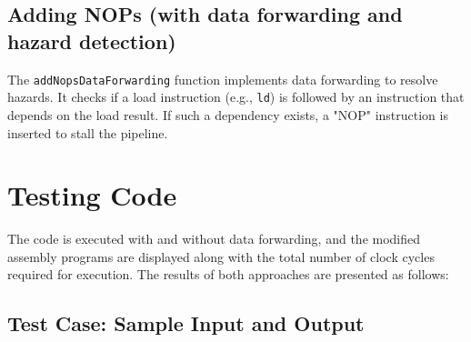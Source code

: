 \documentclass{article}
\begin{document}
\subsection{Adding NOPs (with data forwarding and hazard detection)}

The \texttt{addNopsDataForwarding} function implements data forwarding to resolve hazards. It checks if a load instruction (e.g., \texttt{ld}) is followed by an instruction that depends on the load result. If such a dependency exists, a "NOP" instruction is inserted to stall the pipeline.

\section{Testing Code}

The code is executed with and without data forwarding, and the modified assembly programs are displayed along with the total number of clock cycles required for execution. The results of both approaches are presented as follows:

\subsection{Test Case: Sample Input and Output}
\end{document}
